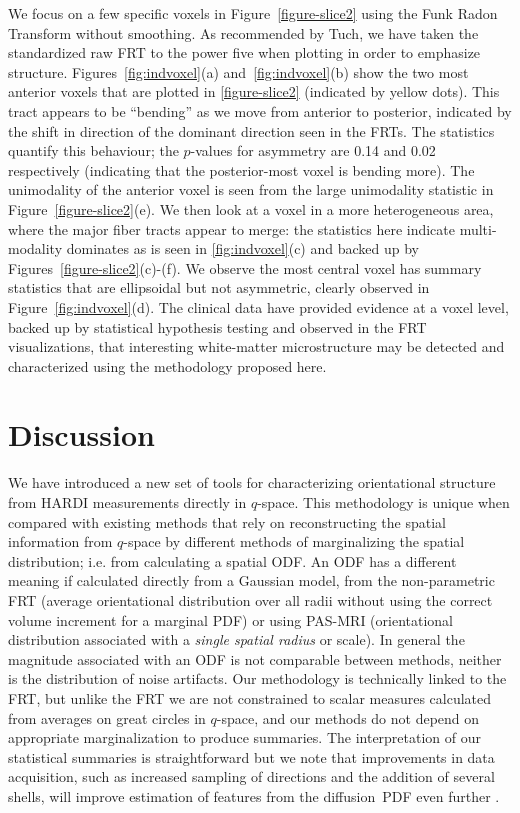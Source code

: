 \documentclass[dvips,aoas,preprint]{imsart}
\numberwithin{equation}{section}
\theoremstyle{plain}
\begin{document}
We focus on a few specific voxels in Figure~\ref{figure-slice2} using
the Funk Radon Transform without smoothing.  As recommended by Tuch,
we have taken the standardized raw FRT to the power five when plotting
in order to emphasize structure.  Figures~\ref{fig:indvoxel}(a)
and~\ref{fig:indvoxel}(b) show the two most anterior voxels that are
plotted in \ref{figure-slice2} (indicated by yellow dots).  This tract
appears to be ``bending'' as we move from anterior to posterior,
indicated by the shift in direction of the dominant direction seen in
the FRTs.  The statistics quantify this behaviour; the $p$-values for
asymmetry are 0.14 and 0.02 respectively (indicating that the
posterior-most voxel is bending more).  The unimodality of the
anterior voxel is seen from the large unimodality statistic in
Figure~\ref{figure-slice2}(e).  We then look at a voxel in a more
heterogeneous area, where the major fiber tracts appear to merge: the
statistics here indicate multi-modality dominates as is seen in
\ref{fig:indvoxel}(c) and backed up by
Figures~\ref{figure-slice2}(c)-(f).  We observe the most central voxel
has summary statistics that are ellipsoidal but not asymmetric,
clearly observed in Figure~\ref{fig:indvoxel}(d).  The clinical data
have provided evidence at a voxel level, backed up by statistical
hypothesis testing and observed in the FRT visualizations, that
interesting white-matter microstructure may be detected and
characterized using the methodology proposed here.

\section{Discussion}

We have introduced a new set of tools for characterizing orientational
structure from HARDI measurements directly in $q$-space.  This
methodology is unique when compared with existing methods that rely on
reconstructing the spatial information from $q$-space by different
methods of marginalizing the spatial distribution; i.e. from
calculating a spatial ODF.  An ODF has a different meaning if
calculated directly from a Gaussian model, from the non-parametric FRT
(average orientational distribution over all radii without using the
correct volume increment for a marginal PDF) or using PAS-MRI
(orientational distribution associated with a {\em single spatial
  radius} or scale).  In general the magnitude associated with an ODF
is not comparable between methods, neither is the distribution of
noise artifacts.  Our methodology is technically linked to the FRT,
but unlike the FRT we are not constrained to scalar measures
calculated from averages on great circles in $q$-space, and our
methods do not depend on appropriate marginalization to produce
summaries.  The interpretation of our statistical summaries is
straightforward but we note that improvements in data acquisition,
such as increased sampling of directions and the addition of several
shells, will improve estimation of features from the diffusion~PDF
even further \citep{Wisco07}.
\end{document}

